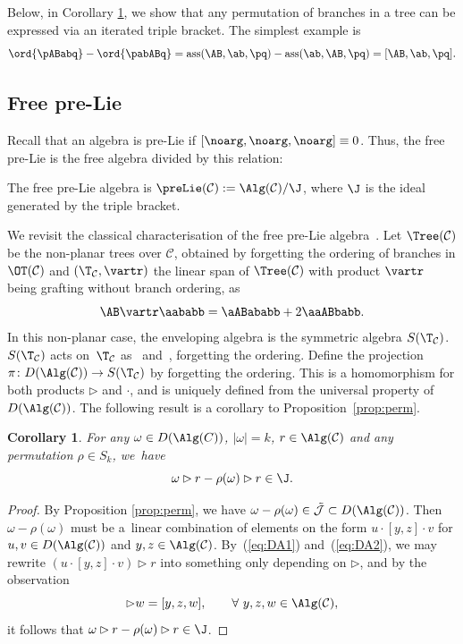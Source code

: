\documentclass[pdftex]{sigma}
\numberwithin{equation}{section}
\newtheorem{Corollary}[Theorem]{Corollary}
\begin{document}
Below, in Corollary \ref{prop:permute}, we show that any permutation of branches in a tree can be expressed via an iterated triple bracket. The simplest example is
\[\ord{\pABabq}- \ord{\pabABq} = \text{ass}(\AB,\ab,\pq) -\text{ass}(\ab,\AB,\pq) = [\AB,\ab,\pq] .\]

\subsection{Free pre-Lie}Recall that an algebra is pre-Lie if $[\noarg,\noarg,\noarg]\equiv 0$. Thus, the free pre-Lie is the free algebra divided by this relation:
\begin{Definition} The free pre-Lie algebra is $\preLie(\mathcal{C}):= \Alg(\mathcal{C})/\J$, where $\J$ is the ideal generated by the triple bracket.
\end{Definition}
We revisit the classical characterisation of the free pre-Lie algebra~\cite{Chapoton_and_Livernet_01,Dzhumadildeav_and_Lofwall_02}.
Let $\Tree(\mathcal{C})$ be the non-planar trees over $\mathcal{C}$, obtained by forgetting the ordering of branches in $\OT(\mathcal{C})$ and
$(\T_{\mathcal{C}},\vartr)$ the linear span of $\Tree(\mathcal{C})$ with product $\vartr$ being grafting without branch ordering, as
\[\AB\vartr \aababb = {\aABababb}+ 2{\aaABbabb}.\]
In this non-planar case, the enveloping algebra is the symmetric algebra $S(\T_{\mathcal{C}})$.
$S(\T_{\mathcal{C}})$ acts on~$\T_{\mathcal{C}}$ as~ and~, forgetting the ordering.
Define the projection $\pi\colon D(\Alg(\mathcal{C}))\rightarrow S(\T_{\mathcal{C}})$ by forgetting the ordering. This is a homomorphism for both products $\rhd$ and $\cdot$, and is uniquely defined from the universal property of $D(\Alg(\mathcal{C}))$. The following result is a corollary to Proposition~\ref{prop:perm}.

\begin{Corollary}\label{prop:permute} For any $\omega \in D(\Alg(C))$, $|\omega|=k$, $r\in \Alg(\mathcal{C})$ and any permutation $\rho\in S_k$, we~have
\[
\omega\rhd r - \rho(\omega)\rhd r \in \J.
\]
\end{Corollary}

\begin{proof}
 By Proposition \ref{prop:perm}, we have $\omega - \rho(\omega) \in \Tilde{\mathcal{J}} \subset D(\Alg(\mathcal{C}))$. Then $\omega -\rho(\omega)$ must be a~linear combination of elements on the form $u\cdot [y,z]\cdot v$ for $u,v \in D(\Alg(\mathcal{C}))$ and $y,z \in \Alg(\mathcal{C})$. By~(\ref{eq:DA1}) and~(\ref{eq:DA2}), we may rewrite $(u \cdot [y,z] \cdot v) \rhd r$ into something only depending on $\rhd$, and by the observation
 \begin{equation*}
 [y,z] \rhd w = [y,z,w], \qquad \forall \ y,z,w \in \Alg(\mathcal{C}),
 \end{equation*}
 it follows that $\omega \rhd r - \rho(\omega) \rhd r \in \J$.
\end{proof}
\end{document}
